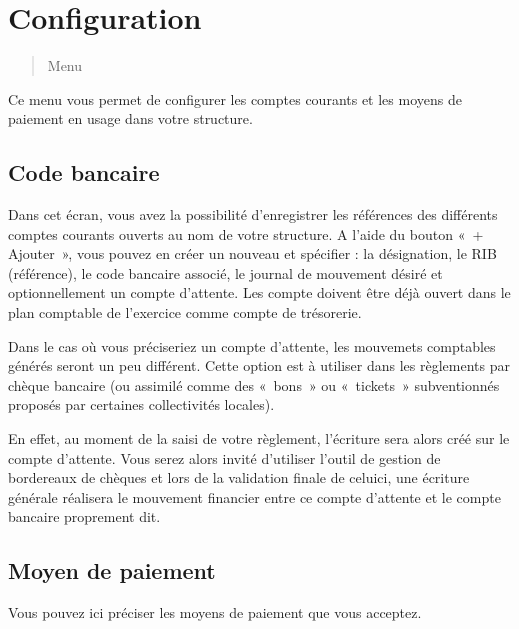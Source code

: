 \documentclass[a4paper,10pt,oneside,french]{sphinxmanual}
\begin{document}
\sphinxstepscope


\section{Configuration}
\label{\detokenize{payoff/config:configuration}}\label{\detokenize{payoff/config::doc}}\begin{quote}

\sphinxAtStartPar
Menu 
\end{quote}

\sphinxAtStartPar
Ce menu vous permet de configurer les comptes courants et les moyens de paiement en usage dans votre structure.


\subsection{Code bancaire}
\label{\detokenize{payoff/config:code-bancaire}}
\sphinxAtStartPar
Dans cet écran, vous avez la possibilité d’enregistrer les références des différents comptes courants ouverts au nom de votre structure.
A l’aide du bouton « + Ajouter », vous pouvez en créer un nouveau et spécifier : la désignation, le RIB (référence), le code bancaire associé, le journal de mouvement désiré et optionnellement un compte d’attente.
Les compte doivent être déjà ouvert dans le plan comptable de l’exercice comme compte de trésorerie.

\sphinxAtStartPar
Dans le cas où vous préciseriez un compte d’attente, les mouvemets comptables générés seront un peu différent.
Cette option est à utiliser dans les règlements par chèque bancaire (ou assimilé comme des « bons » ou « tickets » subventionnés proposés par certaines collectivités locales).

\sphinxAtStartPar
En effet, au moment de la saisi de votre règlement, l’écriture sera alors créé sur le compte d’attente.
Vous serez alors invité d’utiliser l’outil de gestion de bordereaux de chèques et lors de la validation finale de celui\sphinxhyphen{}ci,
une écriture générale réalisera le mouvement financier entre ce compte d’attente et le compte bancaire proprement dit.


\subsection{Moyen de paiement}
\label{\detokenize{payoff/config:moyen-de-paiement}}
\sphinxAtStartPar
Vous pouvez ici préciser les moyens de paiement que vous acceptez.
\end{document}
